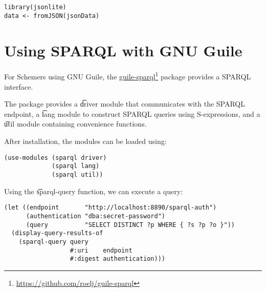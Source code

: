 \begin{siderules}
\begin{verbatim}
library(jsonlite)
data <- fromJSON(jsonData)
\end{verbatim}
\end{siderules}

\section{Using SPARQL with GNU Guile}
\label{sec:sparql-with-guile}

  For Schemers using GNU Guile, the \href{https://github.com/roelj/guile-sparql}%
  {guile-sparql}\footnote{\url{https://github.com/roelj/guile-sparql}} package
  provides a SPARQL interface.

  The package provides a \t{driver} module that communicates with the
  SPARQL endpoint, a \t{lang} module to construct SPARQL queries using
  S-expressions, and a \t{util} module containing convenience functions.

  After installation, the modules can be loaded using:

\begin{siderules}
\begin{verbatim}
(use-modules (sparql driver)
             (sparql lang)
             (sparql util))
\end{verbatim}
\end{siderules}

  Using the \t{sparql-query} function, we can execute a query:

\begin{siderules}
\begin{verbatim}
(let ((endpoint       "http://localhost:8890/sparql-auth")
      (authentication "dba:secret-password")
      (query          "SELECT DISTINCT ?p WHERE { ?s ?p ?o }"))
  (display-query-results-of
    (sparql-query query
                  #:uri    endpoint
                  #:digest authentication)))
\end{verbatim}
\end{siderules}
